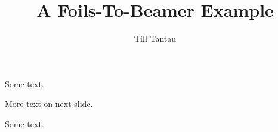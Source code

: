 \documentclass{beamer}
\title{A Foils-To-Beamer Example}
\author{Till Tantau}
\begin{document}
\begin{frame}
\maketitle
\end{frame}


Some text.

\pagebreak

More text on next slide.


Some text.

\endfoil
\end{document}

